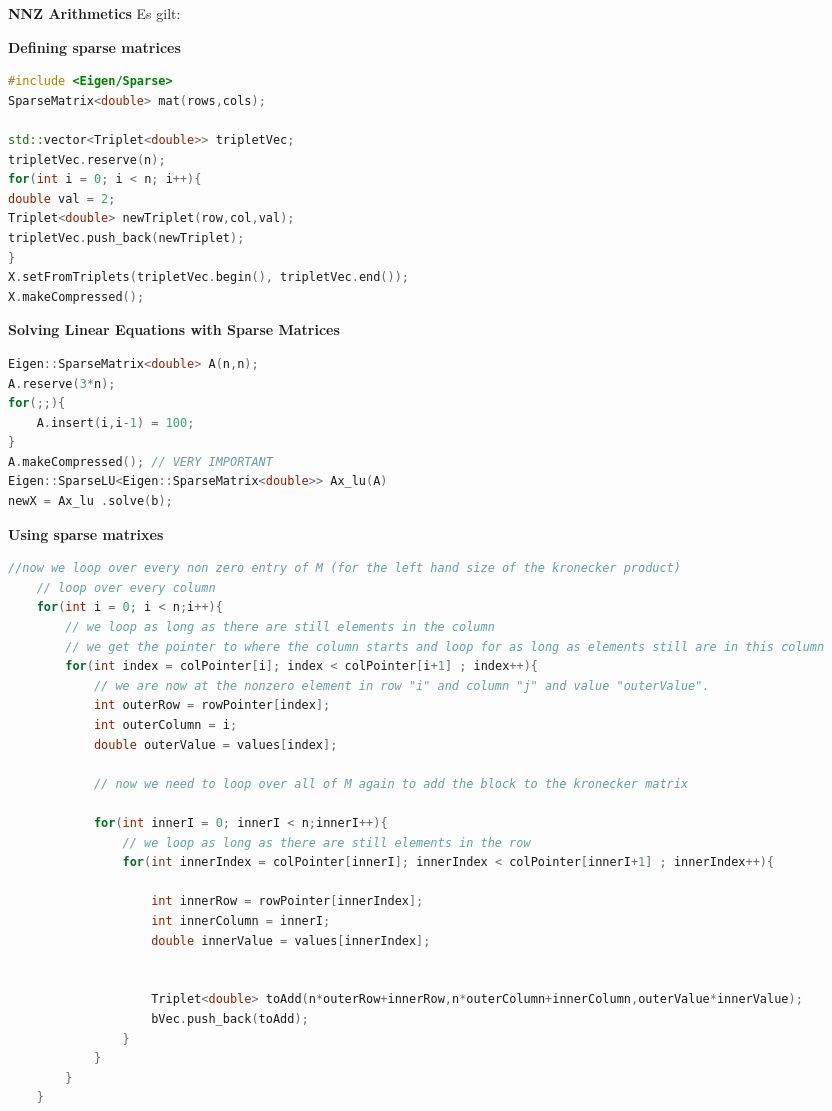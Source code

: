 \documentclass{sciposter}
\newcommand{\TODO}[1]{\todo[inline, color=red!40]{#1}}
\newcommand{\psection}[1]{\par \textbf{\large#1}}
\begin{document}
\begin{multicols}{2}
\TODO{nnz arithmetics}
\psection{NNZ Arithmetics}
Es gilt:


\TODO{unary expression}

\psection{Defining sparse matrices}
\begin{lstlisting}[language=C++]
#include <Eigen/Sparse>
SparseMatrix<double> mat(rows,cols);

std::vector<Triplet<double>> tripletVec;
tripletVec.reserve(n);
for(int i = 0; i < n; i++){
double val = 2;
Triplet<double> newTriplet(row,col,val);
tripletVec.push_back(newTriplet);
}
X.setFromTriplets(tripletVec.begin(), tripletVec.end());
X.makeCompressed();
\end{lstlisting}



\psection{Solving Linear Equations with Sparse Matrices}
\begin{lstlisting}[language=C++]
Eigen::SparseMatrix<double> A(n,n);
A.reserve(3*n);
for(;;){
	A.insert(i,i-1) = 100;
}
A.makeCompressed(); // VERY IMPORTANT
Eigen::SparseLU<Eigen::SparseMatrix<double>> Ax_lu(A) 
newX = Ax_lu .solve(b);
\end{lstlisting}


\psection{Using sparse matrixes}
\begin{lstlisting}[language=c++]
	//now we loop over every non zero entry of M (for the left hand size of the kronecker product)
	// loop over every column
	for(int i = 0; i < n;i++){
		// we loop as long as there are still elements in the column
		// we get the pointer to where the column starts and loop for as long as elements still are in this column
		for(int index = colPointer[i]; index < colPointer[i+1] ; index++){
			// we are now at the nonzero element in row "i" and column "j" and value "outerValue".
			int outerRow = rowPointer[index];
			int outerColumn = i;
			double outerValue = values[index];
			
			// now we need to loop over all of M again to add the block to the kronecker matrix
			
			for(int innerI = 0; innerI < n;innerI++){
				// we loop as long as there are still elements in the row
				for(int innerIndex = colPointer[innerI]; innerIndex < colPointer[innerI+1] ; innerIndex++){
					
					int innerRow = rowPointer[innerIndex];
					int innerColumn = innerI;
					double innerValue = values[innerIndex];
					
					
					Triplet<double> toAdd(n*outerRow+innerRow,n*outerColumn+innerColumn,outerValue*innerValue);
					bVec.push_back(toAdd);
				}
			}
		}
	}
\end{lstlisting}


\end{multicols}
\end{document}
